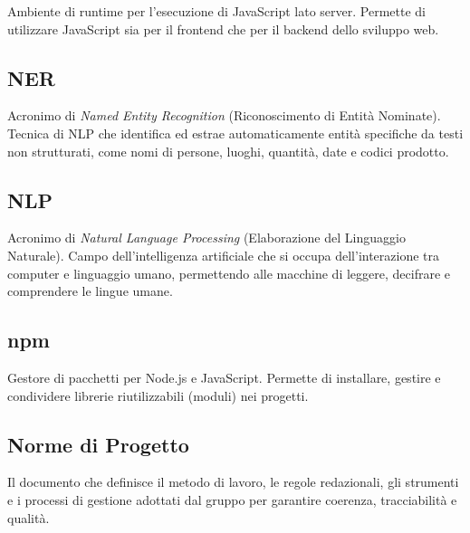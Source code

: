 \documentclass[a4paper, 11pt, oneside]{scrartcl} %
\begin{document}

Ambiente di runtime per l'esecuzione di JavaScript lato server. Permette di utilizzare JavaScript sia per il frontend che per il backend dello sviluppo web.

\vspace{0.5cm}

\subsection*{NER}
Acronimo di \textit{Named Entity Recognition} (Riconoscimento di Entità Nominate). Tecnica di NLP che identifica ed estrae automaticamente entità specifiche da testi non strutturati, come nomi di persone, luoghi, quantità, date e codici prodotto.
\vspace{0.5cm}

\subsection*{NLP}
Acronimo di \textit{Natural Language Processing} (Elaborazione del Linguaggio Naturale). Campo dell'intelligenza artificiale che si occupa dell'interazione tra computer e linguaggio umano, permettendo alle macchine di leggere, decifrare e comprendere le lingue umane.
\vspace{0.5cm}

\subsection*{npm}


Gestore di pacchetti per Node.js e JavaScript. Permette di installare, gestire e condividere librerie riutilizzabili (moduli) nei progetti.

\vspace{0.5cm}

\subsection*{Norme di Progetto}


Il documento che definisce il metodo di lavoro, le regole redazionali, gli strumenti e i processi di gestione adottati dal gruppo per garantire coerenza, tracciabilità e qualità.
\end{document}
